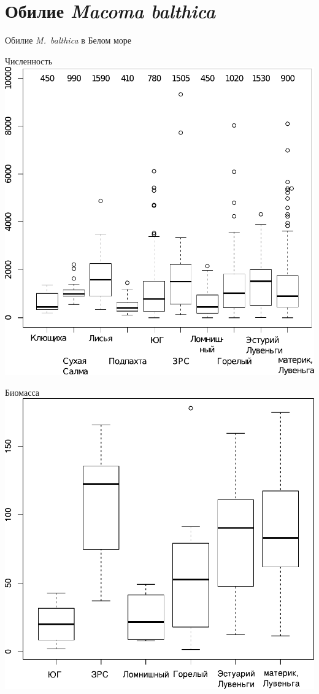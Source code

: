 \documentclass{beamer}
\begin{document}
		\section[Обилие]{Обилие {\it Macoma balthica}}
\begin{frame}{Обилие {\it M.~balthica} в Белом море}
	\begin{minipage}[t]{.49\linewidth}
		\begin{center}
		{\footnotesize Численность}
			\includegraphics[width=\textwidth]{N2_area_White1.pdf}
		\end{center}
	\end{minipage}
%
	\begin{minipage}[t]{.49\linewidth}
		\begin{center}
		{\footnotesize Биомасса}
			\includegraphics[width=\textwidth]{B_Kanda_ru1.pdf}

\end{center}
\end{minipage}
\end{frame}
\end{document}
